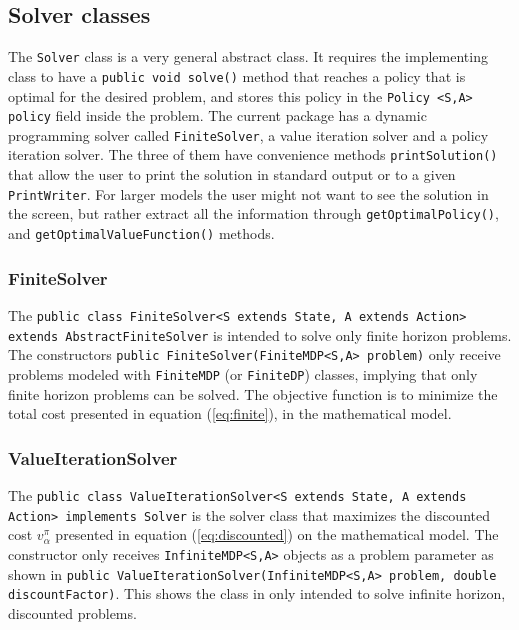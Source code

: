 \documentclass[11pt]{article}
\newcommand {\lil}{\lstinline}
\begin{document}
\subsection{Solver classes}

The \lstinline!Solver! class is a very general abstract class. It requires the implementing class to have a \lstinline!public void solve()! method that reaches a policy that is optimal for the desired problem, and stores this policy in the \lstinline!Policy <S,A> policy! field inside the problem. The current package has a dynamic programming solver called \lstinline!FiniteSolver!, a value iteration solver and a policy iteration solver. The three of them have convenience methods \lil!printSolution()! that allow the user to print the solution in standard output or to a given \lil!PrintWriter!. For larger models the user might not want to see the solution in the screen, but rather extract all the information through \lil!getOptimalPolicy()!, and \lil!getOptimalValueFunction()! methods.

\subsubsection{FiniteSolver}

The \lstinline!public class FiniteSolver<S extends State, A extends Action> extends AbstractFiniteSolver! is intended to solve only finite horizon problems. The constructors \lstinline!public FiniteSolver(FiniteMDP<S,A> problem)!  only receive problems modeled with \lstinline!FiniteMDP! (or \lstinline!FiniteDP!) classes, implying that only finite horizon problems can be solved. The objective function is to minimize the total cost presented in equation (\ref{eq:finite}), in the mathematical model.

\subsubsection{ValueIterationSolver}

The \lstinline!public class ValueIterationSolver<S extends State, A extends Action> implements Solver! is the solver class that maximizes the discounted cost $v_\alpha^{\pi}$ presented in equation (\ref{eq:discounted}) on the mathematical model. The constructor  only receives \lstinline!InfiniteMDP<S,A>! objects as a problem parameter as shown in \lstinline!public ValueIterationSolver(InfiniteMDP<S,A> problem, double discountFactor)!. This shows the class in only intended to solve infinite horizon, discounted problems.
\end{document}
